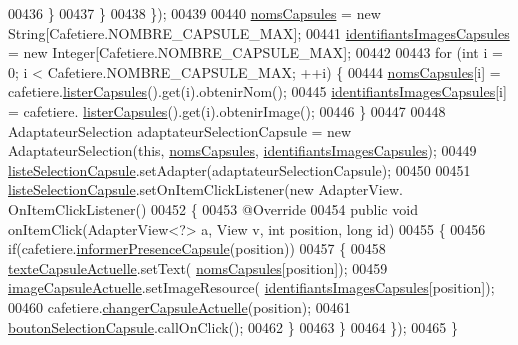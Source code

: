\begin{DoxyCode}
00436                 \}
00437             \}
00438         \});
00439 
00440         \hyperlink{classcom_1_1example_1_1ekawa_1_1_ihm_a9d61b7bfd998d449bb405dcf5e6e4e89}{nomsCapsules} = \textcolor{keyword}{new} String[Cafetiere.NOMBRE\_CAPSULE\_MAX];
00441         \hyperlink{classcom_1_1example_1_1ekawa_1_1_ihm_af35b42764d9f7b10c8bc0e210c3ba76d}{identifiantsImagesCapsules} = \textcolor{keyword}{new} Integer[Cafetiere.NOMBRE\_CAPSULE\_MAX];
00442 
00443         \textcolor{keywordflow}{for} (\textcolor{keywordtype}{int} i = 0; i < Cafetiere.NOMBRE\_CAPSULE\_MAX; ++i) \{
00444             \hyperlink{classcom_1_1example_1_1ekawa_1_1_ihm_a9d61b7bfd998d449bb405dcf5e6e4e89}{nomsCapsules}[i] = cafetiere.\hyperlink{classcom_1_1example_1_1ekawa_1_1_cafetiere_a86149d999dc196c3d97c855be0073e99}{listerCapsules}().get(i).obtenirNom();
00445             \hyperlink{classcom_1_1example_1_1ekawa_1_1_ihm_af35b42764d9f7b10c8bc0e210c3ba76d}{identifiantsImagesCapsules}[i] = cafetiere.
      \hyperlink{classcom_1_1example_1_1ekawa_1_1_cafetiere_a86149d999dc196c3d97c855be0073e99}{listerCapsules}().get(i).obtenirImage();
00446         \}
00447 
00448         AdaptateurSelection adaptateurSelectionCapsule = \textcolor{keyword}{new} AdaptateurSelection(\textcolor{keyword}{this}, 
      \hyperlink{classcom_1_1example_1_1ekawa_1_1_ihm_a9d61b7bfd998d449bb405dcf5e6e4e89}{nomsCapsules}, \hyperlink{classcom_1_1example_1_1ekawa_1_1_ihm_af35b42764d9f7b10c8bc0e210c3ba76d}{identifiantsImagesCapsules});
00449         \hyperlink{classcom_1_1example_1_1ekawa_1_1_ihm_a0842447d70bca2098431fa532c1c94e8}{listeSelectionCapsule}.setAdapter(adaptateurSelectionCapsule);
00450 
00451         \hyperlink{classcom_1_1example_1_1ekawa_1_1_ihm_a0842447d70bca2098431fa532c1c94e8}{listeSelectionCapsule}.setOnItemClickListener(\textcolor{keyword}{new} AdapterView.
      OnItemClickListener()
00452         \{
00453             @Override
00454             \textcolor{keyword}{public} \textcolor{keywordtype}{void} onItemClick(AdapterView<?> a, View v, \textcolor{keywordtype}{int} position, \textcolor{keywordtype}{long} \textcolor{keywordtype}{id})
00455             \{
00456                 \textcolor{keywordflow}{if}(cafetiere.\hyperlink{classcom_1_1example_1_1ekawa_1_1_cafetiere_a35a291f849346b374f63324bc3ecd70b}{informerPresenceCapsule}(position))
00457                 \{
00458                     \hyperlink{classcom_1_1example_1_1ekawa_1_1_ihm_a3a9c8a185607e09fed0df62e46925786}{texteCapsuleActuelle}.setText(
      \hyperlink{classcom_1_1example_1_1ekawa_1_1_ihm_a9d61b7bfd998d449bb405dcf5e6e4e89}{nomsCapsules}[position]);
00459                     \hyperlink{classcom_1_1example_1_1ekawa_1_1_ihm_a82418c4769be80ea67628e2ae8e85ee4}{imageCapsuleActuelle}.setImageResource(
      \hyperlink{classcom_1_1example_1_1ekawa_1_1_ihm_af35b42764d9f7b10c8bc0e210c3ba76d}{identifiantsImagesCapsules}[position]);
00460                     cafetiere.\hyperlink{classcom_1_1example_1_1ekawa_1_1_cafetiere_a686b4e821ea9164323753eb123576921}{changerCapsuleActuelle}(position);
00461                     \hyperlink{classcom_1_1example_1_1ekawa_1_1_ihm_a866bc916203a767c5f9def913b59175d}{boutonSelectionCapsule}.callOnClick();
00462                 \}
00463             \}
00464         \});
00465     \}
\end{DoxyCode}
